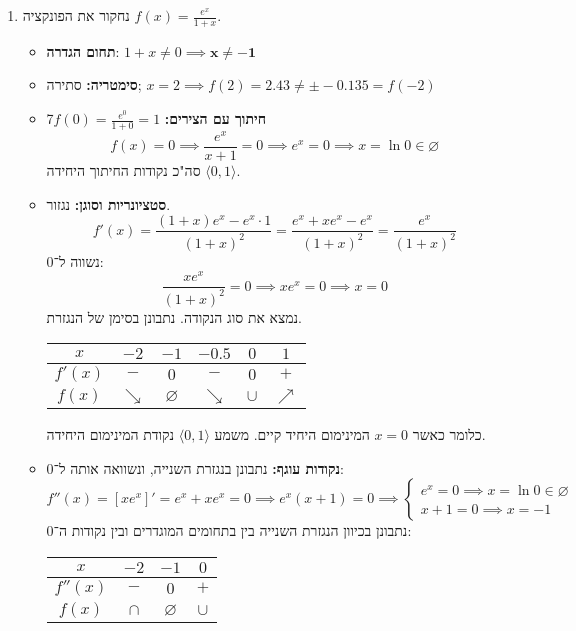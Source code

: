 \documentclass[]{article}
\newcommand\ra    {\rangle}
\newcommand\la    {\langle}
\begin{document}
	\begin{enumerate}
		\item נחקור את הפונקציה $f(x) = \frac{e^{x}}{1 + x}$. 
		\begin{itemize}
			\item \textbf{תחום הגדרה}:
				$1 + x \neq 0 \implies \bm{x \neq -1}$
			\item \textbf{סימטריה:} סתירה; $x = 2 \implies f(2) = 2.43 \neq \pm -0.135 = f(-2)$
			\item \textbf{חיתוך עם הצירים:} $f(0) = \frac{e^{0}}{1 + 0} = 1$7
			\[ f(x) = 0 \implies \frac{e^{x}}{x + 1} = 0 \implies e^{x} = 0 \implies x = \ln 0 \in \varnothing \]
			סה"כ נקודות החיתוך היחידה $\la 0, 1 \ra$. 
			\item \textbf{סטציונריות וסוגן:} נגזור. 
			\[ f'(x) = \frac{(1 + x)e^{x} - e^x \cdot 1}{(1 + x)^2} = \frac{e^x + xe^x - e^x}{(1 + x)^2} = \frac{e^x}{(1 + x)^2} \]
			נשווה ל־0: 
			\[ \frac{xe^x}{(1 + x)^2} = 0 \implies xe^x = 0 \implies x = 0 \]
			נמצא את סוג הנקודה. נתבונן בסימן של הנגזרת. 
			\begin{center}
				\begin{tabular}{|c|c|c|c|c|c|}
					\hline $x$ & $-2$& $-1$ & $-0.5$ & $0$ & $1$ \\
					\hline $f'(x)$ & $-$ & $0$ & $-$ & $0$ & $+$ \\
					\hline $f(x)$ & $\searrow$ & $\varnothing$ & $\searrow$ & $\cup$ & $\nearrow$ \\
					\hline
				\end{tabular}
			\end{center}
			כלומר כאשר $x = 0$ המינימום היחיד קיים. משמע $\la 0, 1 \ra$ נקודת המינימום היחידה. 
			\item \textbf{נקודות עוגף: }נתבונן בנגזרת השנייה, ונשוואה אותה ל־0: 
			\[ f''(x) = [xe^x]' = e^x + xe^x = 0 \implies e^x(x + 1) = 0 \implies \begin{cases}
				e^x = 0 \implies x = \ln 0 \in \varnothing \\
				x + 1 = 0 \implies x = -1
			\end{cases} \]
			נתבונן בכיוון הנגזרת השנייה בין בתחומים המוגדרים ובין נקודות ה־0: 
			\begin{center}
				\begin{tabular}{|c|c|c|c|}
					\hline $x$ & $-2$ & $-1$ & $0$ \\
					\hline $f''(x)$ & $-$ & $0$ & $+$ \\
					\hline $f(x)$ & $\cap$ & $\varnothing$ & $\cup$ \\
					\hline
				\end{tabular}

\end{center}
\end{itemize}
\end{enumerate}
\end{document}
